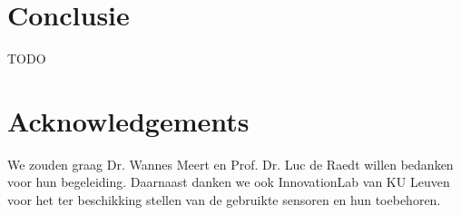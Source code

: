 \documentclass{article}
\begin{document}
\section{Conclusie}
TODO


\section*{Acknowledgements}
We zouden graag Dr. Wannes Meert en Prof. Dr. Luc de Raedt willen bedanken voor hun begeleiding. Daarnaast danken we ook InnovationLab van KU Leuven voor het ter beschikking stellen van de gebruikte sensoren en hun toebehoren.

\appendix



\end{document}
